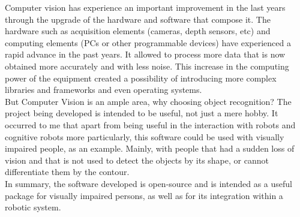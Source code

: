 Computer vision has experience an important improvement in the last years through the upgrade of the hardware and software that compose it. The hardware such as acquisition elements (cameras, depth sensors, etc) and computing elements (PCs or other programmable devices) have experienced a rapid advance in the past years. It allowed to process more data that is now obtained more accurately and with less noise. This increase in the computing power of the equipment created a possibility of introducing more complex libraries and frameworks and even operating systems. 
\\

But Computer Vision is an ample area, why choosing object recognition? The project being developed is intended to be useful, not just a mere hobby. It occurred to me that apart from being useful in the interaction with robots and cognitive robots more particularly, this software could be used with visually impaired people, as an example. Mainly, with people that had a sudden loss of vision and that is not used to detect the objects by its shape, or cannot differentiate them by the contour. 
\\

In summary, the software developed is open-source and is intended as a useful package for visually impaired persons, as well as for its integration within a robotic system. 

\newpage
 
\newpage

